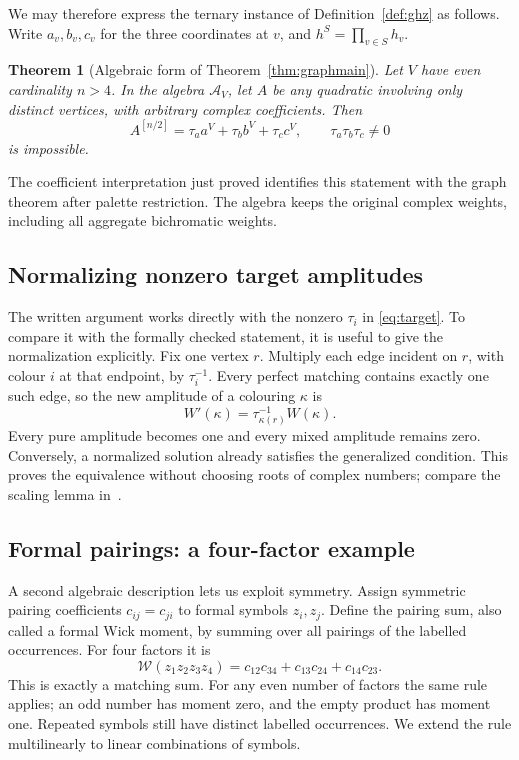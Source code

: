 \documentclass[11pt]{article}
\newtheorem{theorem}{Theorem}[section]
\theoremstyle{definition}
\theoremstyle{plain}
\numberwithin{equation}{section}
\begin{document}
We may therefore express the ternary instance of
Definition~\ref{def:ghz} as follows. Write \(a_v,b_v,c_v\) for the three
coordinates at \(v\), and \(h^S=\prod_{v\in S}h_v\).

\begin{theorem}[Algebraic form of Theorem~\ref{thm:graphmain}]\label{thm:main}
Let \(V\) have even cardinality \(n>4\). In the algebra \(\mathcal A_V\),
let \(A\) be any quadratic involving only distinct vertices, with arbitrary
complex coefficients. Then
\begin{equation}
 A^{[n/2]}=\tau_a a^V+\tau_b b^V+\tau_c c^V,
 \qquad \tau_a\tau_b\tau_c\ne0
 \tag{1}\label{eq:target}
\end{equation}
is impossible.
\end{theorem}

The coefficient interpretation just proved identifies this statement with
the graph theorem after palette restriction. The algebra keeps the original
complex weights, including all aggregate bichromatic weights.

\subsection{Normalizing nonzero target amplitudes}\label{sec:normalization}

The written argument works directly with the nonzero \(\tau_i\) in
\eqref{eq:target}. To compare it with the formally checked statement, it is
useful to give the normalization explicitly. Fix one vertex \(r\).
Multiply each edge incident on \(r\), with colour \(i\) at that endpoint,
by \(\tau_i^{-1}\). Every perfect matching contains exactly one such edge,
so the new amplitude of a colouring \(\kappa\) is
\[
 W'(\kappa)=\tau_{\kappa(r)}^{-1}W(\kappa).
\]
Every pure amplitude becomes one and every mixed amplitude remains zero.
Conversely, a normalized solution already satisfies the generalized
condition. This proves the equivalence without choosing roots of complex
numbers; compare the scaling lemma in~\cite[Lemma~14]{cgi}.

\subsection{Formal pairings: a four-factor example}\label{sec:pairings}

A second algebraic description lets us exploit symmetry. Assign symmetric
pairing coefficients \(c_{ij}=c_{ji}\) to formal symbols \(z_i,z_j\).
Define the pairing sum, also called a formal Wick moment, by summing over
all pairings of the labelled occurrences. For four factors it is
\[
 \mathcal W(z_1z_2z_3z_4)
 =c_{12}c_{34}+c_{13}c_{24}+c_{14}c_{23}.
\]
This is exactly a matching sum. For any even number of factors the same
rule applies; an odd number has moment zero, and the empty product has
moment one. Repeated symbols still have distinct labelled occurrences.
We extend the rule multilinearly to linear combinations of symbols.
\end{document}
